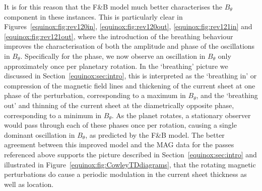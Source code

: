 It is for this reason that the F{\&}B model much better characterises the $B_{\theta}$ component in these instances. This is particularly clear in Figures~\ref{equinox:fig:rev120in}, \ref{equinox:fig:rev120out}, \ref{equinox:fig:rev121in} and \ref{equinox:fig:rev121out}, where the introduction of the breathing behaviour improves the characterisation of both the amplitude and phase of the oscillations in $B_{\theta}$. Specifically for the phase, we now observe an oscillation in $B_{\theta}$ only approximately once per planetary rotation. In the `breathing' picture we discussed in Section~\ref{equinox:sec:intro}, this is interpreted as the `breathing in' or compression of the magnetic field lines and thickening of the current sheet at one phase of the perturbation, corresponding to a maximum in $B_{\theta}$, and the `breathing out' and thinning of the current sheet at the diametrically opposite phase, corresponding to a minimum in $B_{\theta}$. As the planet rotates, a stationary observer would pass through each of these phases once per rotation, causing a single dominant oscillation in $B_{\theta}$, as predicted by the F{\&}B model. The better agreement between this improved model and the MAG data for the passes referenced above supports the picture described in Section~\ref{equinox:sec:intro} and illustrated in Figure~\ref{equinox:fig:CowleyTDdiagrams}, that the rotating magnetic perturbations do cause a periodic modulation in the current sheet thickness as well as location. 

